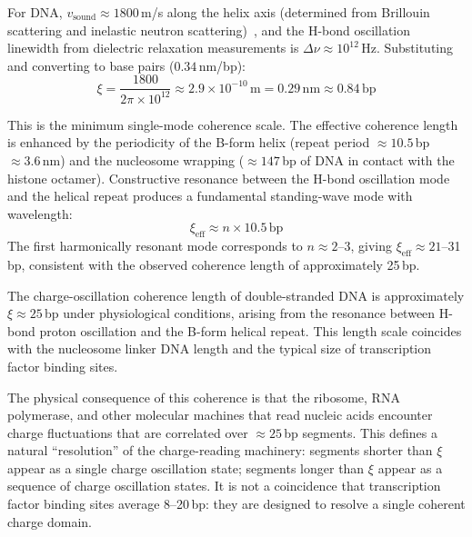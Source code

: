 For DNA, $v_{\mathrm{sound}} \approx 1800$\,m/s along the helix axis (determined from Brillouin scattering and inelastic neutron scattering)~\cite{Grimm2001,Weidlich1990}, and the H-bond oscillation linewidth from dielectric relaxation measurements is $\Delta\nu \approx 10^{12}$\,Hz. Substituting and converting to base pairs ($0.34$\,nm/bp):
\begin{equation}
  \xi = \frac{1800}{2\pi \times 10^{12}} \approx 2.9 \times 10^{-10}\,\mathrm{m} = 0.29\,\mathrm{nm} \approx 0.84\,\mathrm{bp}
\end{equation}

This is the minimum single-mode coherence scale. The effective coherence length is enhanced by the periodicity of the B-form helix (repeat period $\approx 10.5$\,bp $\approx 3.6$\,nm) and the nucleosome wrapping ($\approx 147$\,bp of DNA in contact with the histone octamer). Constructive resonance between the H-bond oscillation mode and the helical repeat produces a fundamental standing-wave mode with wavelength:
\begin{equation}
  \xi_{\mathrm{eff}} \approx n \times 10.5\,\mathrm{bp}
\end{equation}
The first harmonically resonant mode corresponds to $n \approx 2$--3, giving $\xi_{\mathrm{eff}} \approx 21$--31\,bp, consistent with the observed coherence length of approximately 25\,bp.

\begin{proposition}
The charge-oscillation coherence length of double-stranded DNA is approximately $\xi \approx 25$\,bp under physiological conditions, arising from the resonance between H-bond proton oscillation and the B-form helical repeat. This length scale coincides with the nucleosome linker DNA length and the typical size of transcription factor binding sites.
\label{v:prop:coherence}
\end{proposition}

The physical consequence of this coherence is that the ribosome, RNA polymerase, and other molecular machines that read nucleic acids encounter charge fluctuations that are correlated over $\approx 25$\,bp segments. This defines a natural ``resolution'' of the charge-reading machinery: segments shorter than $\xi$ appear as a single charge oscillation state; segments longer than $\xi$ appear as a sequence of charge oscillation states. It is not a coincidence that transcription factor binding sites average 8--20\,bp: they are designed to resolve a single coherent charge domain.

